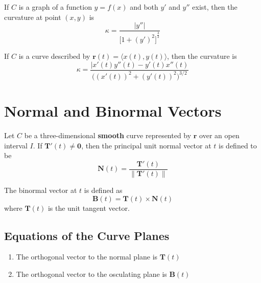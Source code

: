 \documentclass{article}
\begin{document}
If $C$ is a graph of a function $y=f(x)$ and both $y'$ and $y''$ exist, then the curvature at point $(x, y)$ is
\[\kappa = \frac{|y''|}{{\Big[1+{(y')}^2\Big]}^\frac{3}{2}}\]

If $C$ is a curve described by $\mathbf{r}(t)=\langle x(t), y(t) \rangle$, then the curvature is
\[\kappa = \frac{|x'(t)y''(t)-y'(t)x''(t)}{\Big({(x'(t))}^2+{(y'(t))}^2\Big)^{3/2}}\]

\section*{Normal and Binormal Vectors}

Let $C$ be a three-dimensional \textbf{smooth} curve represented by $\mathbf{r}$ over an open interval $I$. If $\mathbf{T}'(t)\neq\mathbf{0}$, then the principal unit normal vector at $t$ is defined to be
\[\mathbf{N}(t)=\frac{\mathbf{T}'(t)}{\|\mathbf{T}'(t)\|}\]

The binormal vector at $t$ is defined as
\[\mathbf{B}(t)=\mathbf{T}(t)\times\mathbf{N}(t)\]
where $\mathbf{T}(t)$ is the unit tangent vector.

\subsection*{Equations of the Curve Planes}
\begin{enumerate}
    \item The orthogonal vector to the normal plane is $\mathbf{T}(t)$
    \item The orthogonal vector to the osculating plane is $\mathbf{B}(t)$
\end{enumerate}
\end{document}
